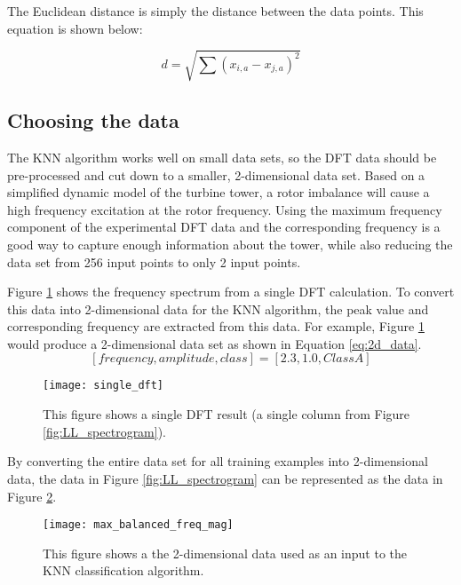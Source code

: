 The Euclidean distance is simply the distance between the data points.  This equation is shown below:

\begin{equation}
	d = \sqrt{\sum{\left(x_{i,a}-x_{j,a}\right)^2}}
\end{equation}

\subsection{Choosing the data}
The KNN algorithm works well on small data sets, so the DFT data should be pre-processed and cut down to a smaller, 2-dimensional data set.  Based on a simplified dynamic model of the turbine tower, a rotor imbalance will cause a high frequency excitation at the rotor frequency.  Using the maximum frequency component of the experimental DFT data and the corresponding frequency is a good way to capture enough information about the tower, while also reducing the data set from 256 input points to only 2 input points.

Figure \ref{fig:single_dft} shows the frequency spectrum from a single DFT calculation.  To convert this data into 2-dimensional data for the KNN algorithm, the peak value and corresponding frequency are extracted from this data.  For example, Figure \ref{fig:single_dft} would produce a 2-dimensional data set as shown in Equation \ref{eq:2d_data}.
\begin{equation} \label{eq:2d_data}
	[frequency, amplitude, class] = [2.3, 1.0, Class A]
\end{equation}

\begin{figure}
	\centering
	\texttt{[image: single\_dft]}
	\decoRule
	\caption{This figure shows a single DFT result (a single column from Figure \ref{fig:LL_spectrogram}).}
	\label{fig:single_dft}
\end{figure}

By converting the entire data set for all training examples into 2-dimensional data, the data in Figure \ref{fig:LL_spectrogram} can be represented as the data in Figure \ref{fig:max_balanced_freq_mag}.

\begin{figure}
	\centering
	\texttt{[image: max\_balanced\_freq\_mag]}
	\decoRule
	\caption{This figure shows a the 2-dimensional data used as an input to the KNN classification algorithm.}
	\label{fig:max_balanced_freq_mag}
\end{figure}


